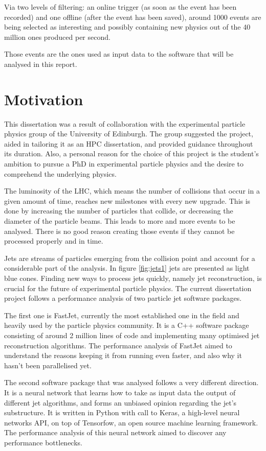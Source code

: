 Via two levels of filtering: an online trigger (as soon as the event has been recorded) and one offline (after the event has been saved), around 1000 events are being selected as interesting and possibly containing new physics out of the 40 million ones produced per second. %

Those events are the ones used as input data to the software that will be analysed in this report.
\section{Motivation}
This dissertation was a result of collaboration with the experimental particle physics group of the University of Edinburgh. The group suggested the project, aided in tailoring it as an HPC dissertation, and provided guidance throughout its duration. Also, a personal reason for the choice of this project is the student's ambition to pursue a PhD in experimental particle physics and the desire to comprehend the underlying physics.     

The luminosity of the LHC, which means the number of collisions that occur in a given amount of time, reaches new milestones with every new upgrade. This is done by increasing the number of particles that collide, or decreasing the diameter of the particle beams. This leads to more and more events to be analysed. There is no good reason creating those events if they cannot be processed properly and in time.

Jets are streams of particles emerging from the collision point and account for a considerable part of the analysis. In figure \ref{fig:jets1} jets are presented as light blue cones. Finding new ways to process jets quickly, namely jet reconstruction, is crucial for the future of experimental particle physics. The current dissertation project follows a performance analysis of two particle jet software packages.

The first one is FastJet, currently the most established one in the field and heavily used by the particle physics community. It is a C++ software package consisting of around 2 million lines of code and implementing many optimised jet reconstruction algorithms. The performance analysis of FastJet aimed to understand the reasons keeping it from running even faster, and also why it hasn't been parallelised yet. 


The second software package that was analysed follows a very different direction. It is a neural network that learns how to take as input data the output of different jet algorithms, and forms an unbiased opinion regarding the jet's substructure. It is written in Python with call to Keras, a high-level neural networks API, on top of Tensorfow, an open source machine learning framework. The performance analysis of this neural network aimed to discover any performance bottlenecks.

